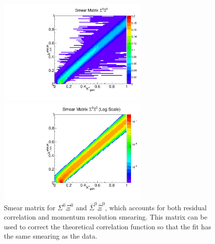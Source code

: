 \begin{figure}[ht]
\begin{minipage}{17.5pc}
\includegraphics[width=17.5pc]{Figures/SmearMatrices/2016-7-19-SmearMatrixSigmaXi0NormLLAA.pdf}
\end{minipage}\hspace{0.5pc}
\begin{minipage}{17.5pc}
\includegraphics[width=17.5pc]{Figures/SmearMatrices/2016-7-19-SmearMatrixSigmaXi0NormLLAALog.pdf}
\end{minipage} 
\caption[Smear matrix -- $\Sigma^0\Xi^0$ and $\bar{\Sigma}^0\bar{\Xi}^0$]{
Smear matrix for $\Sigma^0\Xi^0$ and $\bar{\Sigma}^0\bar{\Xi}^0$, which accounts for both residual correlation and momentum resolution smearing. This matrix can be used to correct the theoretical correlation function so that the fit has the same smearing as the data.
}
\end{figure}


